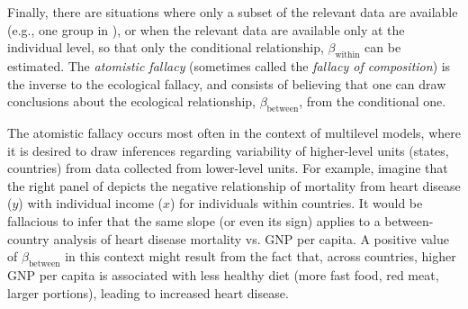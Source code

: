 Finally, there are situations where only a subset of the relevant data are available (e.g.,
one group in ), or when the relevant data are available only
at the individual level,
so that only the conditional relationship,
$\beta_{\textrm{within}}$ can be estimated. The \emph{atomistic fallacy}
(sometimes called the \emph{fallacy of composition})
is the inverse to the
ecological fallacy, and consists of believing that one can draw conclusions
about the ecological relationship, $\beta_{\textrm{between}}$, from the conditional one.

The atomistic fallacy occurs most often in the context of multilevel models,
where it is desired to draw inferences regarding variability of higher-level units
(states, countries) from data collected from lower-level units.
For example, imagine that the right panel of  depicts the negative
relationship of mortality from heart disease ($y$) with individual income ($x$) for
individuals within countries. It would be fallacious to infer that the same slope
(or even its sign) applies to a between-country analysis of heart disease mortality vs.
GNP per capita. A positive value of $\beta_{\textrm{between}}$ in this context might
result from the fact that, across countries, higher GNP per capita is associated with
less healthy diet (more fast food, red meat, larger portions), leading to increased heart disease.

